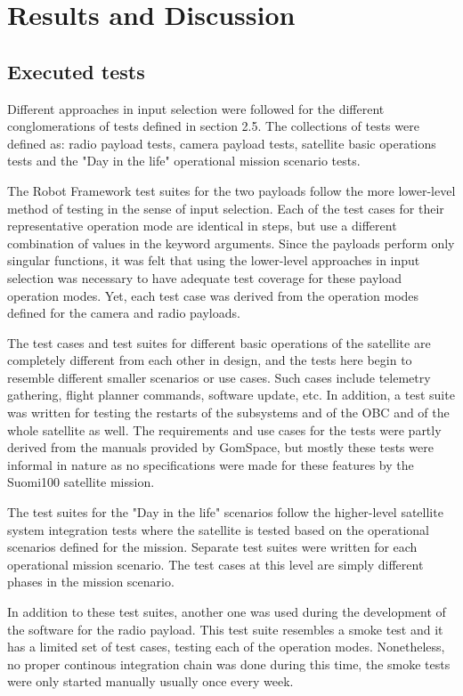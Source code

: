 \documentclass[english,12pt,a4paper,pdftex,elec,utf8]{aaltothesis}
\begin{document}
\section{Results and Discussion}
\subsection{Executed tests}
Different approaches in input selection were followed for the different conglomerations of tests defined in section 2.5. The collections of tests were defined as: radio payload tests, camera payload tests, satellite basic operations tests and the "Day in the life" operational mission scenario tests. \par 
The Robot Framework test suites for the two payloads follow the more lower-level method of testing in the sense of input selection. Each of the test cases for their representative operation mode are identical in steps, but use a different combination of values in the keyword arguments. Since the payloads perform only singular functions, it was felt that using the lower-level approaches in input selection was necessary to have adequate test coverage for these payload operation modes. Yet, each test case was derived from the operation modes defined for the camera and radio payloads. \par
The test cases and test suites for different basic operations of the satellite are completely different from each other in design, and the tests here begin to resemble different smaller scenarios or use cases. Such cases include telemetry gathering, flight planner commands, software update, etc. In addition, a test suite was written for testing the restarts of the subsystems and of the OBC and of the whole satellite as well. The requirements and use cases for the tests were partly derived from the manuals provided by GomSpace, but mostly these tests were informal in nature as no specifications were made for these features by the Suomi100 satellite mission.\par 
The test suites for the "Day in the life" scenarios follow the higher-level satellite system integration tests where the satellite is tested based on the operational scenarios defined for the mission. Separate test suites were written for each operational mission scenario. The test cases at this level are simply different phases in the mission scenario.\par
In addition to these test suites, another one was used during the development of the software for the radio payload. This test suite resembles a smoke test and it has a limited set of test cases, testing each of the operation modes. Nonetheless, no proper continous integration chain was done during this time, the smoke tests were only started manually usually once every week.\par   
\end{document}
